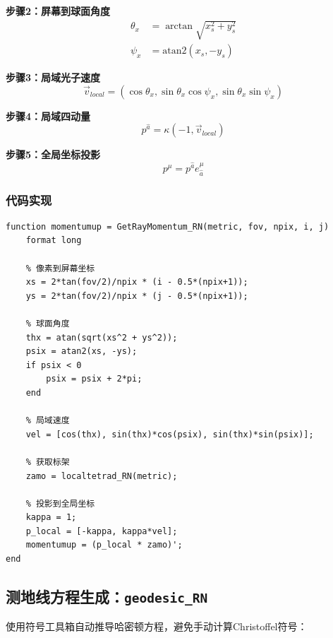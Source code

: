 \documentclass[a4paper,12pt]{article}
\begin{document}
\textbf{步骤2：屏幕到球面角度}
\begin{align}
    \theta_x &= \arctan\sqrt{x_s^2 + y_s^2} \\
    \psi_x &= \text{atan2}(x_s, -y_s)
\end{align}

\textbf{步骤3：局域光子速度}
\begin{equation}
    \vec{v}_{local} = (\cos\theta_x, \sin\theta_x \cos\psi_x, \sin\theta_x \sin\psi_x)
\end{equation}

\textbf{步骤4：局域四动量}
\begin{equation}
    p^{\hat{a}} = \kappa(-1, \vec{v}_{local})
\end{equation}

\textbf{步骤5：全局坐标投影}
\begin{equation}
    p^\mu = p^{\hat{a}} e^\mu_{\hat{a}}
\end{equation}

\subsubsection{代码实现}

\begin{lstlisting}[caption={光线动量计算}]
function momentumup = GetRayMomentum_RN(metric, fov, npix, i, j)
    format long
    
    % 像素到屏幕坐标
    xs = 2*tan(fov/2)/npix * (i - 0.5*(npix+1));
    ys = 2*tan(fov/2)/npix * (j - 0.5*(npix+1));
    
    % 球面角度
    thx = atan(sqrt(xs^2 + ys^2));
    psix = atan2(xs, -ys);
    if psix < 0
        psix = psix + 2*pi;
    end
    
    % 局域速度
    vel = [cos(thx), sin(thx)*cos(psix), sin(thx)*sin(psix)];
    
    % 获取标架
    zamo = localtetrad_RN(metric);
    
    % 投影到全局坐标
    kappa = 1;
    p_local = [-kappa, kappa*vel];
    momentumup = (p_local * zamo)';
end
\end{lstlisting}

\subsection{测地线方程生成：\texttt{geodesic\_RN}}

使用符号工具箱自动推导哈密顿方程，避免手动计算Christoffel符号：
\end{document}
